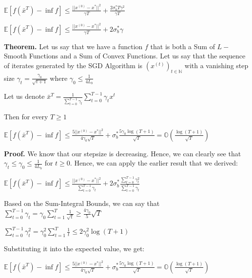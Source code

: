 $\mathbb{E} [f(\bar{x}^T) - \inf f] \leq \frac{||x^{(0)} - x^*||^2}{\gamma T} + \frac{2 \sigma_b^* T\gamma^2}{\gamma T}$ \newline

$\mathbb{E} [f(\bar{x}^T) - \inf f] \leq \frac{||x^{(0)} - x^*||^2}{\gamma T} + 2 \sigma_b^* \gamma$ \newline

\noindent \textbf{Theorem.} Let us say that we have a function $f$ that is both a Sum of $L-$Smooth Functions and a Sum of Convex Functions. Let us say that the sequence of iterates generated by the SGD Algorithm is $(x^{(t)})_{t \in \mathbb{N}}$ with a vanishing step size $\gamma_t = \frac{\gamma_0}{\sqrt{t + 1}}$ where $\gamma_0 \leq \frac{1}{4L_{b}}$ 

Let us denote $\bar{x}^T = \frac{1}{\sum_{t = 0}^{T - 1} \gamma_t} \sum_{t = 0}^{T - 1} \gamma_t x^t$ \newline 

Then for every $T \geq 1$ \newline 

$\mathbb{E}[f(\bar{x}^T) - \inf f] \leq \frac{5 ||x^{(0)} - x^*||^2}{4 \gamma_0 \sqrt{T}} + \sigma_b^* \frac{5 \gamma_0 \log{(T + 1)}}{\sqrt{T}} = \mathbb{O}(\frac{\log{(T + 1)}}{\sqrt{T}})$ \newline 

\noindent \textbf{Proof.} We know that our stepsize is decreasing. Hence, we can clearly see that $\gamma_t \leq \gamma_0 \leq \frac{1}{4L_{b}}$ for $t \geq 0$. Hence, we can apply the earlier result that we derived: \newline 

$\mathbb{E}[f(\bar{x}^T) - \inf f] \leq \frac{||x^{(0)} - x^*||^2}{\sum_{t = 0}^{T - 1} \gamma_t} + 2\sigma_b^* \frac{\sum_{t = 0}^{T - 1} \gamma_t^2}{\sum_{t = 0}^{T - 1} \gamma_t}$ \newline 

Based on the Sum-Integral Bounds, we can say that $\sum_{t = 0}^{T - 1} \gamma_t = \gamma_0 \sum_{t = 1}^{T} \frac{1}{\sqrt{t}} \geq \frac{4\gamma_0}{5} \sqrt{T}$ \newline 

$\sum_{t = 0}^{T - 1} \gamma_t^2 = \gamma_0^2 \sum_{t = 1}^{T} \frac{1}{t} \leq 2 \gamma_0^2 \log(T + 1)$ \newline

Substituting it into the expected value, we get: \newline 

$\mathbb{E}[f(\bar{x}^T) - \inf f] \leq \frac{5 ||x^{(0)} - x^*||^2}{4 \gamma_0 \sqrt{T}} + \sigma_b^* \frac{5 \gamma_0 \log{(T + 1)}}{\sqrt{T}} = \mathbb{O}(\frac{\log{(T + 1)}}{\sqrt{T}})$ \newline 


